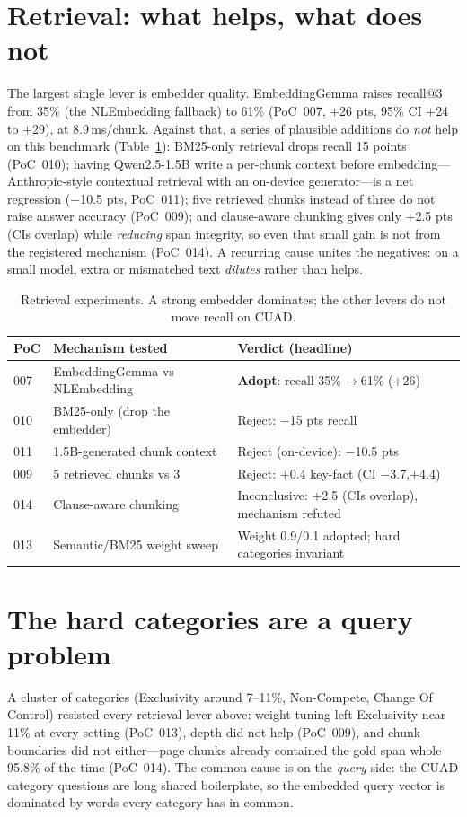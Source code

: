 \documentclass[11pt]{article}
\newcommand{\poc}[1]{PoC~#1}
\begin{document}
\section{Retrieval: what helps, what does not}\label{sec:retrieval}
The largest single lever is embedder quality. EmbeddingGemma raises recall@3 from 35\% (the
NLEmbedding fallback) to 61\% (\poc{007}, $+$26 pts, 95\% CI $+$24 to $+$29), at 8.9\,ms/chunk.
Against that, a series of plausible additions do \emph{not} help on this benchmark
(Table~\ref{tab:retrieval}): BM25-only retrieval drops recall 15 points (\poc{010}); having
Qwen2.5-1.5B write a per-chunk context before embedding---Anthropic-style contextual retrieval
with an on-device generator---is a net regression ($-$10.5 pts, \poc{011}); five retrieved
chunks instead of three do not raise answer accuracy (\poc{009}); and clause-aware chunking
gives only $+$2.5 pts (CIs overlap) while \emph{reducing} span integrity, so even that small
gain is not from the registered mechanism (\poc{014}). A recurring cause unites the negatives:
on a small model, extra or mismatched text \emph{dilutes} rather than helps.

\begin{table}[t]
\centering
\small
\begin{tabular}{l l l}
\toprule
PoC & Mechanism tested & Verdict (headline) \\
\midrule
007 & EmbeddingGemma vs NLEmbedding & \textbf{Adopt}: recall 35\%$\rightarrow$61\% ($+$26) \\
010 & BM25-only (drop the embedder)  & Reject: $-$15 pts recall \\
011 & 1.5B-generated chunk context   & Reject (on-device): $-$10.5 pts \\
009 & 5 retrieved chunks vs 3        & Reject: $+$0.4 key-fact (CI $-$3.7,$+$4.4) \\
014 & Clause-aware chunking          & Inconclusive: $+$2.5 (CIs overlap), mechanism refuted \\
013 & Semantic/BM25 weight sweep     & Weight 0.9/0.1 adopted; hard categories invariant \\
\bottomrule
\end{tabular}
\caption{Retrieval experiments. A strong embedder dominates; the other levers do not move
recall on CUAD.}
\label{tab:retrieval}
\end{table}

\section{The hard categories are a query problem}\label{sec:query}
A cluster of categories (Exclusivity around 7--11\%, Non-Compete, Change Of Control) resisted
every retrieval lever above: weight tuning left Exclusivity near 11\% at every setting
(\poc{013}), depth did not help (\poc{009}), and chunk boundaries did not either---page
chunks already contained the gold span whole 95.8\% of the time (\poc{014}). The common cause
is on the \emph{query} side: the CUAD category questions are long shared boilerplate, so the
embedded query vector is dominated by words every category has in common.
\end{document}
